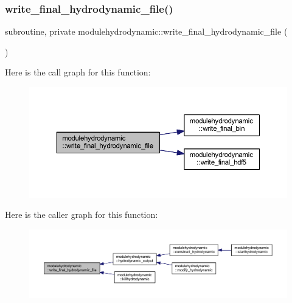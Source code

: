 \subsubsection{\texorpdfstring{write\+\_\+final\+\_\+hydrodynamic\+\_\+file()}{write\_final\_hydrodynamic\_file()}}
{\footnotesize\ttfamily subroutine, private modulehydrodynamic\+::write\+\_\+final\+\_\+hydrodynamic\+\_\+file (\begin{DoxyParamCaption}{ }\end{DoxyParamCaption})\hspace{0.3cm}{\ttfamily [private]}}

Here is the call graph for this function\+:\nopagebreak
\begin{figure}[H]
\begin{center}
\leavevmode
\includegraphics[width=350pt]{namespacemodulehydrodynamic_a633e5bd5e4240a071e45a505396056eb_cgraph}
\end{center}
\end{figure}
Here is the caller graph for this function\+:\nopagebreak
\begin{figure}[H]
\begin{center}
\leavevmode
\includegraphics[width=350pt]{namespacemodulehydrodynamic_a633e5bd5e4240a071e45a505396056eb_icgraph}
\end{center}
\end{figure}
\mbox{\label{namespacemodulehydrodynamic_affc6eb8b5c260e1da6146c7a34c7849b}} 
